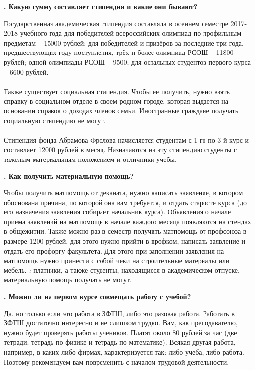 \documentclass[14pt]{extarticle}
\newcounter{question}
\newcommand\Que[1]{%
    \begin{minipage}{\textwidth}
    \leavevmode\par
    \stepcounter{question}
    \noindent
    {\large\textbf{\thequestion. #1}}\par}
\newcommand\Ans[2][]{%
    \leavevmode\par\noindent
    {\leftskip37pt
    \textbf{#1}#2\par}
    \end{minipage}}
\begin{document}
\Que{Какую сумму составляет стипендия и какие они бывают?}
\Ans{Государственная академическая стипендия составляла в осеннем семестре 2017-2018 учебного года для победителей всероссийских олимпиад по профильным предметам – 15000 рублей; для победителей и призёров за последние три года, предшествующих году поступления, трёх и более олимпиад РСОШ – 11800 рублей; одной олимпиады РСОШ -- 9500; для остальных студентов первого курса – 6600 рублей. \\ \\ Также существует социальная стипендия. Чтобы ее получить, нужно взять справку в социальном отделе в своем родном городе, которая выдается на основании справок о доходах членов семьи. Иностранные граждане получать социальную стипендию не могут. \\ \\ Стипендия фонда Абрамова-Фролова начисляется студентам с 1-го по 3-й курс и составляет 12000 рублей в месяц. Назначаются на эту стипендию студенты с тяжелым материальным положением и отличники учебы.}

\Que{Как получить материальную помощь?}
\Ans{Чтобы получить матпомощь от деканата, нужно написать заявление, в котором обоснована причина, по которой она вам требуется, и отдать старосте курса (до его назначения заявления собирает начальник курса). Объявления о начале приема заявлений на матпомощь в начале каждого месяца появляются на стендах в общежитии. Также можно раз в семестр получить матпомощь от профсоюза в размере 1200 рублей, для этого нужно прийти в профком, написать заявление и отдать его профоргу факультета. Для этого при заполнении заявления на матпомощь нужно принести с собой чеки на строительные материалы или мебель. {\em \bfВнимание:} платники, а также студенты, находящиеся в академическом отпуске, материальную помощь получать не могут. }

\Que{Можно ли на первом курсе совмещать работу с учебой?}
\Ans{Да, но только если это работа в ЗФТШ, либо это разовая работа. Работать в ЗФТШ достаточно интересно и не слишком трудно. Вам, как преподавателю, нужно будет проверять работы учеников. Платят около 80 рублей за час (две тетради: тетрадь по физике и тетрадь по математике). Всякая другая работа, например, в каких-либо фирмах, характеризуется так: либо учеба, либо работа. Поэтому рекомендуем вам повременить с началом трудовой деятельности.}
\end{document}
